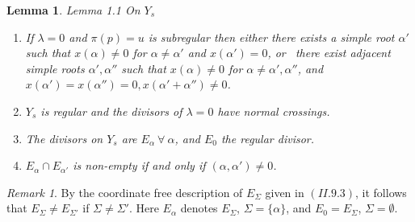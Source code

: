 \documentclass{memo-l}
\newtheorem{lemma}[theorem]{Lemma}
\theoremstyle{definition}
\theoremstyle{remark}
\newtheorem*{remark*}{Remark} %
\numberwithin{section}{chapter}
\numberwithin{equation}{chapter}
\begin{document}
\begin{lemma}{Lemma 1.1} On $Y_{s}$
\begin{enumerate}[label=\alph*)]
\item If ${\lambda}  =  0$ and ${\pi}(p)  =  u$ is subregular then either
 there exists a simple root ${\alpha}'$ such that $x({\alpha})\ne 0$ for
${\alpha}\ne {\alpha}'$ and $x({\alpha}')  =  0$, or        
\ there exist adjacent simple roots ${\alpha}',{\alpha''}$ such that
$x({\alpha})\ne 0$ for ${\alpha}\ne {\alpha}',{\alpha''}$, and
$x({\alpha}')  =  x({\alpha''})  =  0, x({\alpha}'+{\alpha''})\ne 0$.        
\item $Y_{s}$ is regular and the divisors of ${\lambda}  =  0$ have normal
crossings.
\item The divisors on $Y_{s}$ are $E_{{\alpha}} {\ \forall\ } {\alpha}$, and
$E_{0}$ the regular divisor.
\item $E_{{\alpha}} \cap E_{{\alpha}'}$ is non-empty if and only if
$({\alpha},{\alpha}') \ne 0$.  
\end{enumerate}
\end{lemma}

\begin{remark*} %
By the coordinate free
description of $E_{{\Sigma}}$ given in $(II.9.3)$, it follows that
$E_{{\Sigma}} \ne E_{{\Sigma}'}$ if ${\Sigma} \ne {\Sigma}'$.  Here $E_\alpha$
denotes $E_\Sigma$, $\Sigma=\{\alpha\}$, and $E_0 = E_\Sigma$, $\Sigma=\emptyset$.
\end{remark*}
\end{document}
